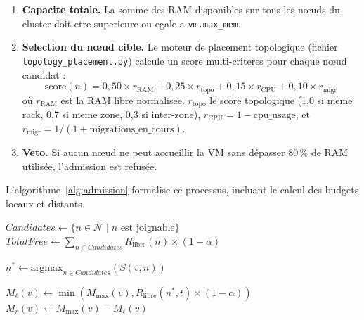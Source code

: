 \begin{enumerate}
    \item \textbf{Capacite totale.} La somme des RAM disponibles sur tous les nœuds du cluster doit etre superieure ou egale a \texttt{vm.max\_mem}.
    \item \textbf{Selection du nœud cible.} Le moteur de placement topologique (fichier \texttt{topology\_placement.py}) calcule un score multi-criteres pour chaque nœud candidat :
    \begin{equation}
        \label{eq:placement-score}
        \text{score}(n) = 0{,}50 \times r_{\text{RAM}} + 0{,}25 \times r_{\text{topo}} + 0{,}15 \times r_{\text{CPU}} + 0{,}10 \times r_{\text{migr}}
    \end{equation}
    o\`u $r_{\text{RAM}}$ est la RAM libre normalisee, $r_{\text{topo}}$ le score topologique (1,0 si meme rack, 0,7 si meme zone, 0,3 si inter-zone), $r_{\text{CPU}} = 1 - \text{cpu\_usage}$, et $r_{\text{migr}} = 1 / (1 + \text{migrations\_en\_cours})$.
    \item \textbf{Veto.} Si aucun nœud ne peut accueillir la VM sans dépasser 80\,\% de RAM utilisée, l'admission est refusée.
\end{enumerate}

L'algorithme~\ref{alg:admission} formalise ce processus, incluant le calcul des budgets locaux et distants.

\begin{algorithm}[H]
    \DontPrintSemicolon

    $Candidates \leftarrow \{n \in \mathcal{N} \mid n \text{ est joignable}\}$\;
    $TotalFree \leftarrow \sum_{n \in Candidates} R_{\text{libre}}(n) \times (1 - \alpha)$\;


    $n^* \leftarrow \text{argmax}_{n \in Candidates} (S(v, n))$\;

    $M_{\ell}(v) \leftarrow \min(M_{\max}(v), R_{\text{libre}}(n^*, t) \times (1 - \alpha))$\;
    $M_r(v) \leftarrow M_{\max}(v) - M_{\ell}(v)$\;


    \;
    \caption{Admission et budgétisation d'une VM}
    \label{alg:admission}
\end{algorithm}

